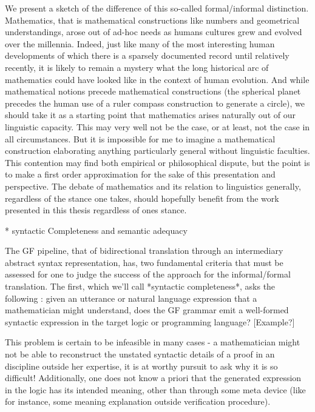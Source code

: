 We present a sketch of the difference of this so-called formal/informal
distinction. Mathematics, that is mathematical constructions like numbers and
geometrical understandings, arose out of ad-hoc needs as humans cultures grew
and evolved over the millennia. Indeed, just like many of the most interesting
human developments of which there is a sparsely documented record until
relatively recently, it is likely to remain a mystery what the long historical
arc of mathematics could have looked like in the context of human evolution. And
while mathematical notions precede mathematical constructions (the spherical
planet precedes the human use of a ruler compass construction to generate a
circle), we should take it as a starting point that mathematics arises naturally
out of our linguistic capacity. This may very well not be the case, or at least,
not the case in all circumstances. But it is impossible for me to imagine a
mathematical construction elaborating anything particularly general without
linguistic faculties. This contention may find both empirical or philosophical
dispute, but the point is to make a first order approximation for the sake of
this presentation and perspective. The debate of mathematics and its relation to
linguistics generally, regardless of the stance one takes, should hopefully
benefit from the work presented in this thesis regardless of ones stance.

  * syntactic Completeness and semantic adequacy

The GF pipeline, that of bidirectional translation through an intermediary
abstract syntax representation, has, two fundamental criteria that must be
assessed for one to judge the success of the approach for the informal/formal
translation. The first, which we'll call *syntactic completeness*, asks the
following : given an utterance or natural language expression that a
mathematician might understand, does the GF grammar emit a well-formed syntactic
expression in the target logic or programming language? [Example?]

This problem is certain to be infeasible in many cases - a mathematician might
not be able to reconstruct the unstated syntactic details of a proof in an
discipline outside her expertise, it is at worthy pursuit to ask why it is so
difficult! Additionally, one does not know a priori that the generated
expression in the logic has its intended meaning, other than through some meta
device (like for instance, some meaning explanation outside verification
procedure).

